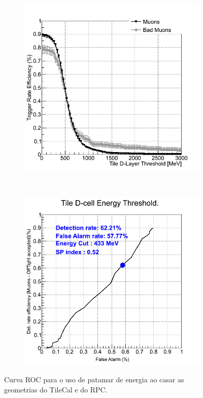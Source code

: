 \begin{figure}[htpb!]
        \centering
        \begin{subfigure}[b]{0.45\textwidth}
                \centering
                \includegraphics[width=\textwidth]{images/minbias/C_match.png}
        \end{subfigure}%
        ~
        \begin{subfigure}[b]{0.45\textwidth}
                \centering
                \includegraphics[width=\textwidth]{images/minbias/C_roc_match.png}
        \end{subfigure}
        \caption{Curva ROC para o uso de patamar de energia ao casar as
        geometrias do TileCal e do RPC.}
        \label{fig:ROCSLminbias}
\end{figure}


